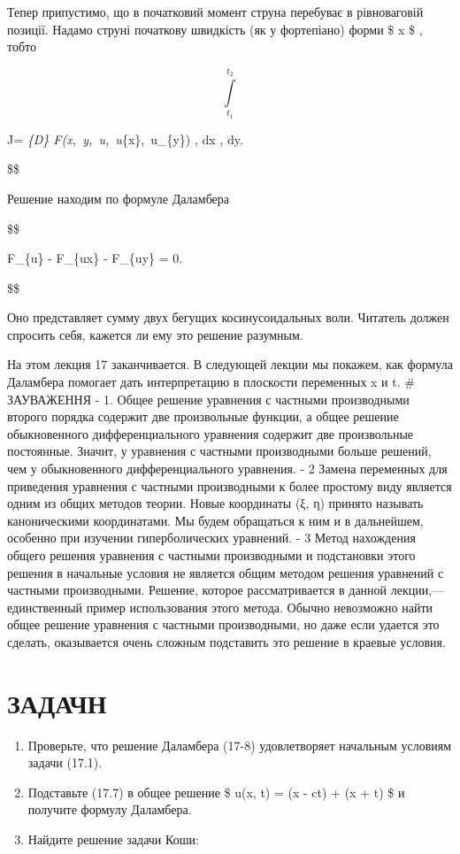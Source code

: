 \documentclass[
  ukrainian,
]{article}
\begin{document}
Тепер припустимо, що в початковий момент струна перебуває в рівноваговій
позиції. Надамо струні початкову швидкість (як у фортепіано) форми \$
\sin x \$ , тобто

\[ \int\limits_{t_1}^{t_2}
\]

J\left[u\right] = \iint\limits\emph{\{D\}
F\left(x,~y,~u,~u}\{x\},~u\_\{y\}\right) , dx , dy.

\$\$

Решение находим по формуле Даламбера

\$\$

F\_\{u\} -  F\_\{ux\} -
 F\_\{uy\} = 0.

\$\$

Оно представляет сумму двух бегущих косинусоидальных воли. Читатель
должен спросить себя, кажется ли ему это решение разумным.

На этом лекция 17 заканчивается. В следующей лекции мы покажем, как
формула Даламбера помогает дать интерпретацию в плоскости переменных x и
t. \# ЗАУВАЖЕННЯ - 1. Общее решение уравнения с частными производными
второго порядка содержит две произвольные функции, а общее решение
обыкновенного дифференциального уравнения содержит две произвольные
постоянные. Значит, у уравнения с частными производными больше решений,
чем у обыкновенного дифференциального уравнения. - 2 Замена переменных
для приведения уравнения с частными производными к более простому виду
является одним из общих методов теории. Новые координаты (ξ, η) принято
называть каноническими координатами. Мы будем обращаться к ним и в
дальнейшем, особенно при изучении гиперболических уравнений. - 3 Метод
нахождения общего решения уравнения с частными производными и
подстановки этого решения в начальные условия не является общим методом
решения уравнений с частными производными. Решение, которое
рассматривается в данной лекции,--- единственный пример использования
этого метода. Обычно невозможно найти общее решение уравнения с частными
производными, но даже если удается это сделать, оказывается очень
сложным подставить это решение в краевые условия.

\section{ЗАДАЧН}\label{ux437ux430ux434ux430ux447ux43d}

\begin{enumerate}
\def\labelenumi{\arabic{enumi}.}
\item
  Проверьте, что решение Даламбера (17-8) удовлетворяет начальным
  условиям задачи (17.1).
\item
  Подставьте (17.7) в общее решение \$ u(x, t) = \psi(x - ct) + \psi(x +
  \epsilon t) \$ и получите формулу Даламбера.
\item
  Найдите решение задачи Коши:
\end{enumerate}
\end{document}
